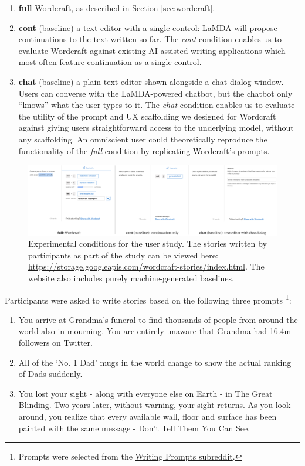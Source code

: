 \begin{enumerate}
    \item \textbf{full} Wordcraft, as described in Section \ref{sec:wordcraft}.
    \item \textbf{cont} (baseline) a text editor with a single control: LaMDA will propose continuations to the text written so far. The \textit{cont} condition enables us to evaluate Wordcraft against existing AI-assisted writing applications which most often feature continuation as a single control.
    \item \textbf{chat} (baseline) a plain text editor shown alongside a chat dialog window.
    Users can converse with the LaMDA-powered chatbot, but the chatbot only ``knows'' what the user types to it.
    The \textit{chat} condition enables us to evaluate the utility of the prompt and UX scaffolding we designed for Wordcraft against giving users straightforward access to the underlying model, without any scaffolding. An omniscient user could theoretically reproduce the functionality of the \textit{full} condition by replicating Wordcraft's prompts.
\end{enumerate}

\begin{figure}[t]
  \centering
  \includegraphics[width=1\linewidth]{figures/conditions.png}
  \caption{Experimental conditions for the user study. The stories written by participants as part of the study can be viewed here: \href{https://storage.googleapis.com/wordcraft-stories/index.html}{https://storage.googleapis.com/wordcraft-stories/index.html}. The website also includes purely machine-generated baselines.}
  \label{fig:conditions}
\end{figure}

\noindent Participants were asked to write stories based on the following three prompts \footnote{Prompts were selected from the \href{https://www.reddit.com/r/WritingPrompts/}{Writing Prompts subreddit}.}:
\begin{enumerate}
    \item You arrive at Grandma's funeral to find thousands of people from around the world also in mourning. You are entirely unaware that Grandma had 16.4m followers on Twitter.
    \item All of the `No. 1 Dad' mugs in the world change to show the actual ranking of Dads suddenly.
    \item You lost your sight - along with everyone else on Earth - in The Great Blinding. Two years later, without warning, your sight returns. As you look around, you realize that every available wall, floor and surface has been painted with the same message - Don't Tell Them You Can See.
\end{enumerate}

